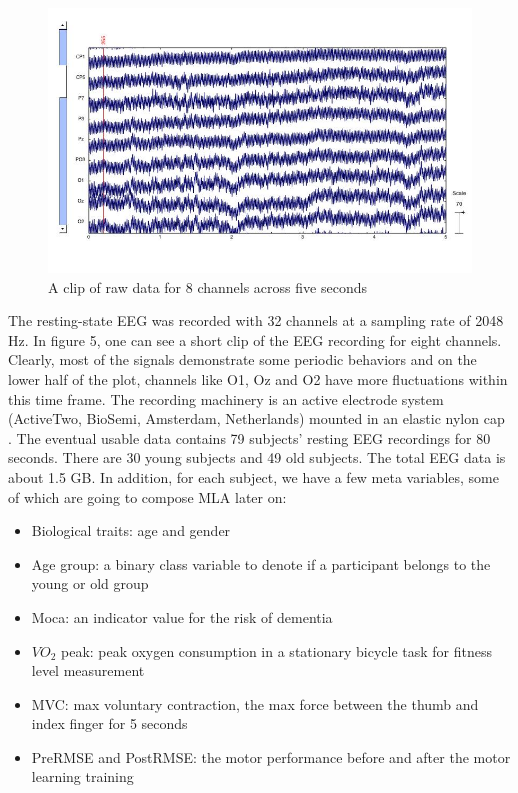 \documentclass[a4paper,11pt,oneside]{article}
\begin{document}
\begin{figure}[h]
	\centering
	\includegraphics[width=1.0\textwidth]{img/visu}
	\caption{A clip of raw data for 8 channels across five seconds}
\end{figure}

  The resting-state EEG was recorded with 32 channels at a sampling rate of 2048 Hz. In figure 5, one can see a short clip of the EEG recording for eight channels. Clearly, most of the signals demonstrate some periodic behaviors and on the lower half of the plot, channels like O1, Oz and O2 have more fluctuations within this time frame.  The recording machinery is an active electrode system (ActiveTwo, BioSemi, Amsterdam, Netherlands) mounted in an elastic nylon cap \cite{jasper1958ten}. The eventual usable data contains 79 subjects' resting EEG recordings for 80 seconds. There are 30 young subjects and 49 old subjects. The total EEG data is about 1.5 GB. In addition, for each subject, we have a few meta variables, some of which are going to compose MLA later on:
\begin{itemize}
	\item Biological traits: age and gender
	\item Age group: a binary class variable to denote if a participant belongs to the young or old group
	\item Moca: an indicator value for the risk of dementia
	\item $VO_2$ peak: peak oxygen consumption in a stationary bicycle task for fitness level measurement
	 \item MVC: max voluntary contraction, the max force between the thumb and index finger for 5 seconds 
	 \item PreRMSE and PostRMSE: the motor performance before and after the motor learning training
\end{itemize}
\end{document}
